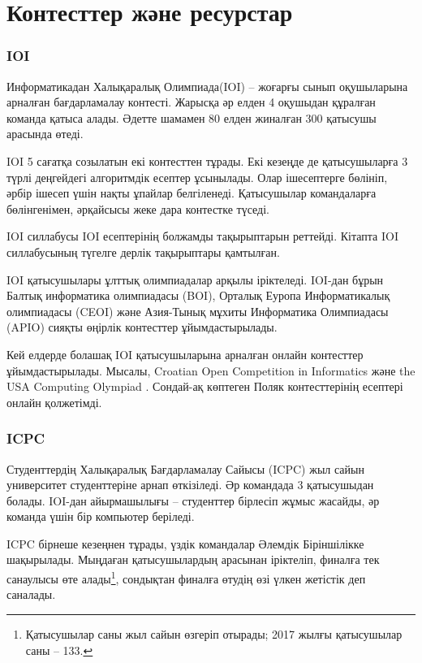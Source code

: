 \section{Контесттер және ресурстар}

\subsubsection{IOI}

Информатикадан Халықаралық Олимпиада(IOI) --
жоғарғы сынып оқушыларына арналған бағдарламалау контесті.
Жарысқа әр елден 4 оқушыдан құралған команда қатыса алады.
Әдетте шамамен 80 елден жиналған 300 қатысушы арасында өтеді.

IOI 5 сағатқа созылатын екі контесттен тұрады.
Екі кезеңде де қатысушыларға 3 түрлі деңгейдегі 
алгоритмдік есептер ұсынылады.
Олар ішесептерге бөлініп,
әрбір ішесеп үшін нақты ұпайлар белгіленеді.
Қатысушылар командаларға бөлінгенімен, 
әрқайсысы жеке дара контестке түседі.

IOI силлабусы \cite{iois} IOI есептерінің болжамды
тақырыптарын реттейді.
Кітапта IOI силлабусының түгелге дерлік тақырыптары
қамтылған.

IOI қатысушылары ұлттық олимпиадалар арқылы іріктеледі.
IOI-дан бұрын Балтық информатика олимпиадасы (BOI),
Орталық Еуропа Информатикалық олимпиадасы (CEOI)
және Азия-Тынық мұхиты Информатика Олимпиадасы (APIO) сияқты өңірлік контесттер ұйымдастырылады.

Кей елдерде болашақ IOI қатысушыларына арналған онлайн контесттер ұйымдастырылады.
Мысалы, Croatian Open Competition in Informatics \cite{coci}
және the USA Computing Olympiad \cite{usaco}.
Сондай-ақ көптеген Поляк контесттерінің есептері онлайн қолжетімді\cite{main}.

\subsubsection{ICPC}

Студенттердің Халықаралық Бағдарламалау Сайысы (ICPC)
жыл сайын университет студенттеріне арнап өткізіледі.
Әр  командада 3 қатысушыдан болады.
IOI-дан айырмашылығы -- студенттер бірлесіп жұмыс жасайды,
әр команда үшін бір компьютер беріледі.

ICPC бірнеше кезеңнен тұрады, үздік
командалар Әлемдік Біріншілікке шақырылады.
Мыңдаған қатысушылардың арасынан іріктеліп, финалға
тек санаулысы өте алады\footnote{Қатысушылар саны жыл сайын өзгеріп отырады; 2017 жылғы қатысушылар саны -- 133.},
сондықтан финалға өтудің өзі үлкен жетістік деп саналады.

